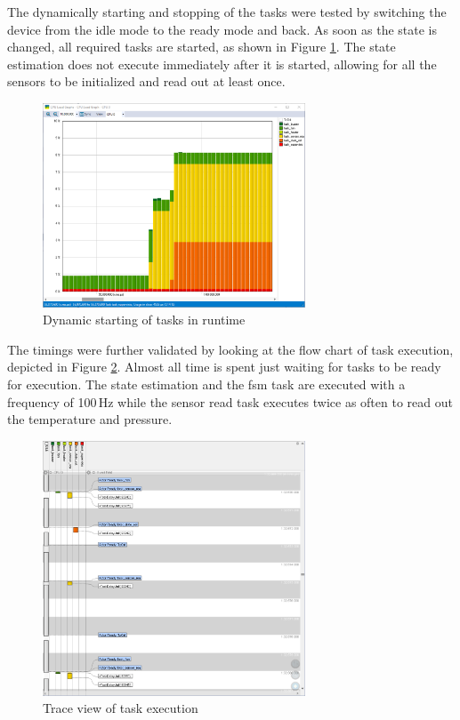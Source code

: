 The dynamically starting and stopping of the tasks were tested by switching the device from the idle mode to the ready mode and back. As soon as the state is changed, all required tasks are started, as shown in Figure \ref{fig:cpu-start}. The state estimation does not execute immediately after it is started, allowing for all the sensors to be initialized and read out at least once.

\begin{figure}[h!]
    \centering
	\includegraphics[width=7.8cm]{images/cpu-start}
	\caption{Dynamic starting of tasks in runtime}
	\label{fig:cpu-start}
\end{figure}

The timings were further validated by looking at the flow chart of task execution, depicted in Figure \ref{fig:cpu-flow}. Almost all time is spent just waiting for tasks to be ready for execution. The state estimation and the \acrshort{fsm} task are executed with a frequency of 100\,Hz while the sensor read task executes twice as often to read out the temperature and pressure.
\begin{figure}[h!]
    \centering
	\includegraphics[width=7.8cm]{images/cpu-flow}
	\caption{Trace view of task execution}
	\label{fig:cpu-flow}
\end{figure}

